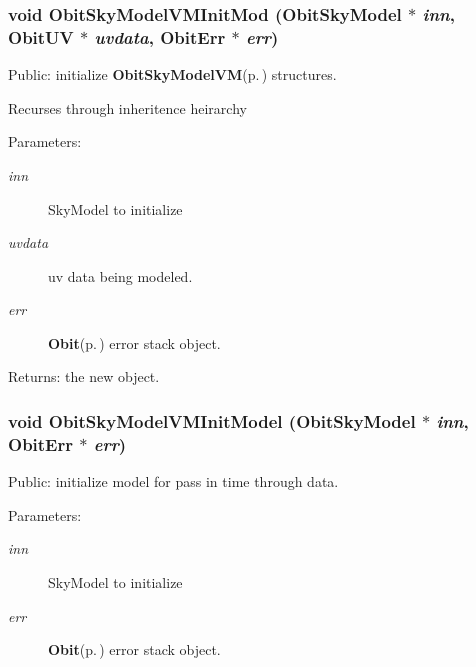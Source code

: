 \subsubsection{\setlength{\rightskip}{0pt plus 5cm}void Obit\-Sky\-Model\-VMInit\-Mod ({\bf Obit\-Sky\-Model} $\ast$ {\em inn}, {\bf Obit\-UV} $\ast$ {\em uvdata}, {\bf Obit\-Err} $\ast$ {\em err})}\label{ObitSkyModelVM_8h_a8}


Public: initialize {\bf Obit\-Sky\-Model\-VM}{\rm (p.\,\pageref{structObitSkyModelVM})} structures. 

Recurses through inheritence heirarchy \begin{Desc}
\item[Parameters:]
\begin{description}
\item[{\em inn}]Sky\-Model to initialize \item[{\em uvdata}]uv data being modeled. \item[{\em err}]{\bf Obit}{\rm (p.\,\pageref{structObit})} error stack object. \end{description}
\end{Desc}
\begin{Desc}
\item[Returns:]the new object. \end{Desc}
\subsubsection{\setlength{\rightskip}{0pt plus 5cm}void Obit\-Sky\-Model\-VMInit\-Model ({\bf Obit\-Sky\-Model} $\ast$ {\em inn}, {\bf Obit\-Err} $\ast$ {\em err})}\label{ObitSkyModelVM_8h_a10}


Public: initialize model for pass in time through data. 

\begin{Desc}
\item[Parameters:]
\begin{description}
\item[{\em inn}]Sky\-Model to initialize \item[{\em err}]{\bf Obit}{\rm (p.\,\pageref{structObit})} error stack object. \end{description}
\end{Desc}
